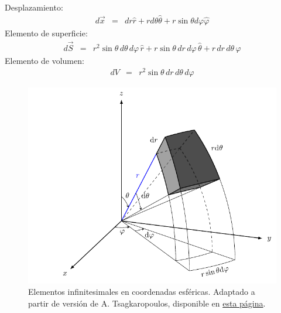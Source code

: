 Desplazamiento:
\begin{eqnarray}
 d \vec{x}
&= & dr {\hat r} + rd\theta {\hat \theta} +r\sin\theta d\varphi {\hat \varphi}
\end{eqnarray}
Elemento de superficie:
\begin{eqnarray}
 d \vec{S}
&=& r^2 \sin\theta \,d\theta \,d\varphi \, {\hat r} + r\sin\theta
\,dr\,d\varphi \, {\hat \theta} +  r\,dr\,d\theta\, {\hat \varphi}
\end{eqnarray}
Elemento de volumen:
\begin{eqnarray}
 dV
&=& r^2\sin\theta \,dr\,d\theta\, d\varphi
\end{eqnarray}
\begin{figure}[H]
    \centering
    \includegraphics[scale=0.7]{fig/volumen-esfericas.pdf}
    \caption{Elementos infinitesimales en coordenadas esféricas. Adaptado a partir de versión de A. Tsagkaropoulos, disponible en \href{https://tikz.net/spherical_volume/}{esta página}.}
    \label{fig:Vol-Esfericas}
\end{figure}